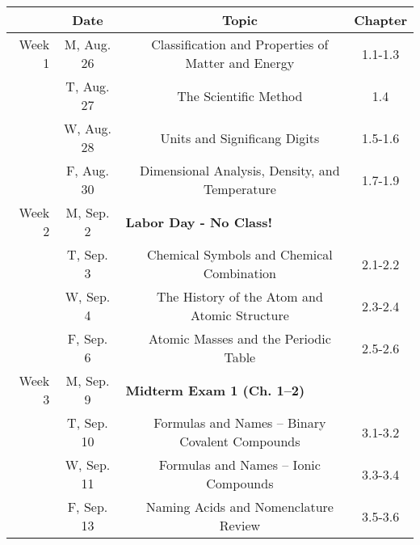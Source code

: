\documentclass[12pt, letterpaper]{article}
\begin{document}
\noindent
\begin{tabular}{rcccc}
& Date && Topic & Chapter\\
\midrule
Week 1 & M, Aug. 26&& Classification and Properties of Matter and Energy & 1.1-1.3\\
& T, Aug. 27&& The Scientific Method & 1.4\\
& W, Aug. 28&& Units and Significang Digits & 1.5-1.6\\
& F, Aug. 30&& Dimensional Analysis, Density, and Temperature & 1.7-1.9\\
\midrule
Week 2 & M, Sep. 2& \multicolumn{3}{l}{\textbf{Labor Day - No Class!}}\\
& T, Sep. 3&& Chemical Symbols and Chemical Combination & 2.1-2.2\\
& W, Sep. 4&& The History of the Atom and Atomic Structure & 2.3-2.4\\
& F, Sep. 6&& Atomic Masses and the Periodic Table & 2.5-2.6\\
\midrule
Week 3 & M, Sep. 9& \multicolumn{3}{l}{\textbf{Midterm Exam 1 (Ch. 1--2)}}\\
& T, Sep. 10&& Formulas and Names -- Binary Covalent Compounds & 3.1-3.2\\
& W, Sep. 11&& Formulas and Names -- Ionic Compounds & 3.3-3.4\\
& F, Sep. 13&& Naming Acids and Nomenclature Review & 3.5-3.6\\
\end{tabular}
\end{document}

